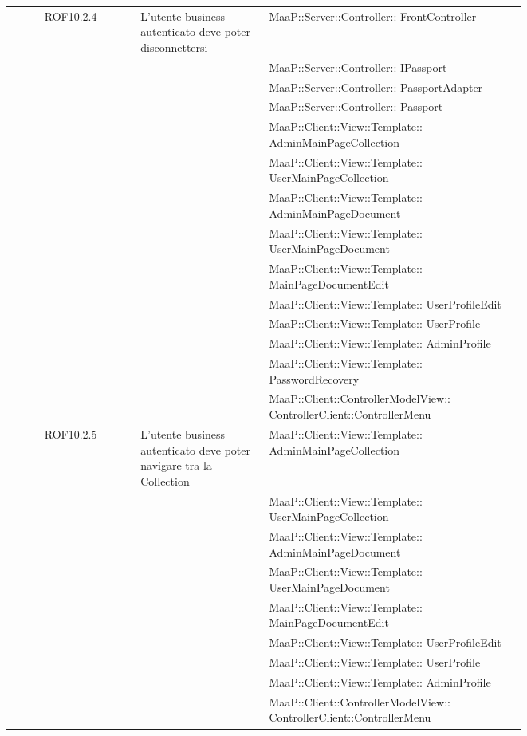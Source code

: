 \begin{center}
\begin{longtable}{|c|p{0.25\linewidth}|p{0.5\linewidth}|}
\midrule
ROF10.2.4
& L'utente business autenticato deve poter disconnettersi
& MaaP::Server::Controller:: FrontController\\
& & MaaP::Server::Controller:: IPassport\\
& & MaaP::Server::Controller:: PassportAdapter\\
& & MaaP::Server::Controller:: Passport\\
& & MaaP::Client::View::Template:: AdminMainPageCollection\\
& & MaaP::Client::View::Template:: UserMainPageCollection\\
& & MaaP::Client::View::Template:: AdminMainPageDocument\\
& & MaaP::Client::View::Template:: UserMainPageDocument\\
& & MaaP::Client::View::Template:: MainPageDocumentEdit\\
& & MaaP::Client::View::Template:: UserProfileEdit\\
& & MaaP::Client::View::Template:: UserProfile\\
& & MaaP::Client::View::Template:: AdminProfile\\
& & MaaP::Client::View::Template:: PasswordRecovery\\
& & MaaP::Client::ControllerModelView:: ControllerClient::ControllerMenu\\

\midrule
ROF10.2.5
& L'utente business autenticato deve poter navigare tra la Collection
& MaaP::Client::View::Template:: AdminMainPageCollection\\
& & MaaP::Client::View::Template:: UserMainPageCollection\\
& & MaaP::Client::View::Template:: AdminMainPageDocument\\
& & MaaP::Client::View::Template:: UserMainPageDocument\\
& & MaaP::Client::View::Template:: MainPageDocumentEdit\\
& & MaaP::Client::View::Template:: UserProfileEdit\\
& & MaaP::Client::View::Template:: UserProfile\\
& & MaaP::Client::View::Template:: AdminProfile\\
& & MaaP::Client::ControllerModelView:: ControllerClient::ControllerMenu\\


\end{longtable}
\end{center}
